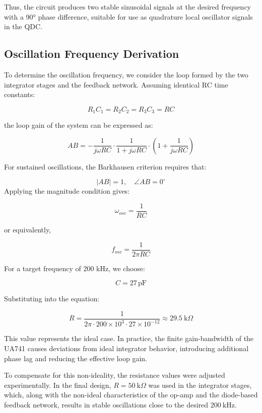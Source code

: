\documentclass[conference]{IEEEtran}
\begin{document}
Thus, the circuit produces two stable sinusoidal signals at the desired frequency with a 90° phase difference, suitable for use as quadrature local oscillator signals in the QDC.


\subsection{Oscillation Frequency Derivation}

To determine the oscillation frequency, we consider the loop formed by the two integrator stages and the feedback network. Assuming identical RC time constants:

\[
R_1C_1 = R_2C_2 = R_3C_3 = RC
\]

the loop gain of the system can be expressed as:


\begin{equation}
AB = -\frac{1}{j\omega RC} \cdot \frac{1}{1 + j\omega RC} \cdot \left(1 + \frac{1}{j\omega RC}\right)
\end{equation}


For sustained oscillations, the Barkhausen criterion requires that:

\[
|AB| = 1, \quad \angle AB = 0^\circ
\]
Applying the magnitude condition gives:

\begin{equation}
\omega_{osc} = \frac{1}{RC}
\end{equation}

or equivalently,

\begin{equation}
f_{osc} = \frac{1}{2\pi RC}
\end{equation}

For a target frequency of 200 kHz, we choose:

\[
C = 27\,\text{pF}
\]

Substituting into the equation:


\begin{equation}
R = \frac{1}{2\pi \cdot 200 \times 10^3 \cdot 27 \times 10^{-12}} \approx 29.5~\text{k}\Omega
\end{equation}

This value represents the ideal case. In practice, the finite gain-bandwidth of the UA741 causes deviations from ideal integrator behavior, introducing additional phase lag and reducing the effective loop gain.

To compensate for this non-ideality, the resistance values were adjusted experimentally. In the final design, $R = 50~\text{k}\Omega$ was used in the integrator stages, which, along with the non-ideal characteristics of the op-amp and the diode-based feedback network, results in stable oscillations close to the desired $200~\text{kHz}$.
\end{document}
